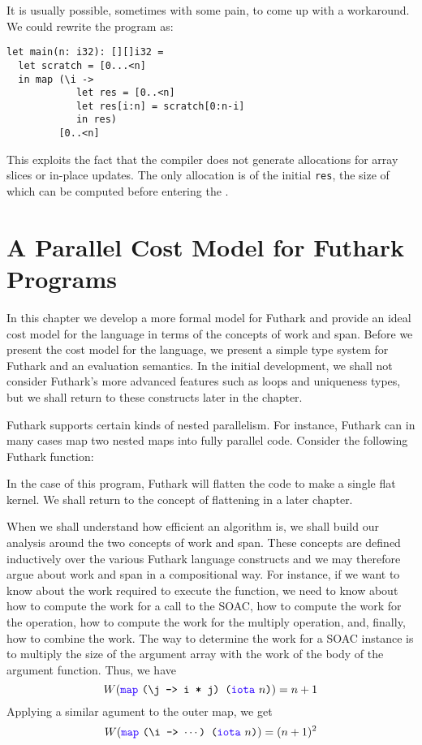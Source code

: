 \documentclass[oneside,11pt]{book}
\newenvironment{wrap}{\vspace{\topskip}\par\noindent\begin{minipage}{\linewidth}}{\end{minipage}\par}
\begin{document}
It is usually possible, sometimes with some pain, to come up with a
workaround.  We could rewrite the program as:

\begin{lstlisting}
let main(n: i32): [][]i32 =
  let scratch = [0...<n]
  in map (\i ->
            let res = [0..<n]
            let res[i:n] = scratch[0:n-i]
            in res)
         [0..<n]
\end{lstlisting}

This exploits the fact that the compiler does not generate allocations
for array slices or in-place updates.  The only allocation is of the
initial \texttt{res}, the size of which can be computed before
entering the .

\chapter{A Parallel Cost Model for Futhark Programs}
\label{chap:costmodel}
In this chapter we develop a more formal model for Futhark and provide
an ideal cost model for the language in terms of the concepts of work
and span. Before we present the cost model for the language, we
present a simple type system for Futhark and an evaluation
semantics. In the initial development, we shall not consider Futhark's
more advanced features such as loops and uniqueness types, but we
shall return to these constructs later in the chapter.

Futhark supports certain kinds of nested parallelism. For instance,
Futhark can in many cases map two nested maps into fully parallel
code. Consider the following Futhark function:

\begin{wrap}

\end{wrap}

\noindent
In the case of this program, Futhark will flatten the code to make a
single flat kernel. We shall return to the concept of flattening in a
later chapter.

When we shall understand how efficient an algorithm is, we shall build
our analysis around the two concepts of work and span. These concepts
are defined inductively over the various Futhark language constructs
and we may therefore argue about work and span in a compositional
way. For instance, if we want to know about the work required to
execute the  function, we need to know about how to
compute the work for a call to the  SOAC, how to compute the
work for the  operation, how to compute the work for the
multiply operation, and, finally, how to combine the work. The way to
determine the work for a  SOAC instance is to multiply the
size of the argument array with the work of the body of the argument
function. Thus, we have
$$ W(\fop{map}~\kw{(\textbackslash{}j -> i * j) (}\fop{iota}~\kw{$n$)}) = n+1 $$
Applying a similar agument to the outer map, we get
$$W(\fop{map}~\kw{(\textbackslash{}i -> $\cdots$) (}\fop{iota}~\kw{$n$)}) = (n+1)^2 $$
\end{document}
